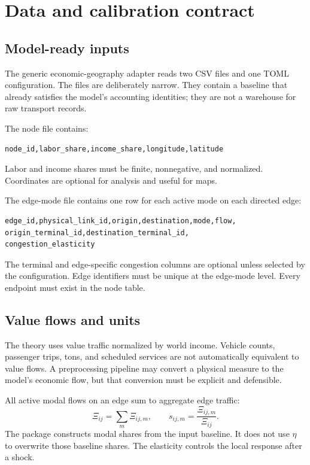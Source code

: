 \chapter{Data and calibration contract}
\label{ch:data}

\section{Model-ready inputs}

The generic economic-geography adapter reads two CSV files and one TOML
configuration. The files are deliberately narrow. They contain a baseline
that already satisfies the model's accounting identities; they are not a
warehouse for raw transport records.

The node file contains:
\begin{lstlisting}
node_id,labor_share,income_share,longitude,latitude
\end{lstlisting}
Labor and income shares must be finite, nonnegative, and normalized. Coordinates
are optional for analysis and useful for maps.

The edge-mode file contains one row for each active mode on each directed edge:
\begin{lstlisting}
edge_id,physical_link_id,origin,destination,mode,flow,
origin_terminal_id,destination_terminal_id,
congestion_elasticity
\end{lstlisting}
The terminal and edge-specific congestion columns are optional unless selected
by the configuration. Edge identifiers must be unique at the edge-mode level.
Every endpoint must exist in the node table.

\section{Value flows and units}

The theory uses value traffic normalized by world income. Vehicle counts,
passenger trips, tons, and scheduled services are not automatically equivalent
to value flows. A preprocessing pipeline may convert a physical measure to the
model's economic flow, but that conversion must be explicit and defensible.

All active modal flows on an edge sum to aggregate edge traffic:
\[
 \Xi_{ij}=\sum_m\Xi_{ij,m},
 \qquad
 s_{ij,m}=\frac{\Xi_{ij,m}}{\Xi_{ij}}.
\]
The package constructs modal shares from the input baseline. It does not use
\(\eta\) to overwrite those baseline shares. The elasticity controls the local
response after a shock.

